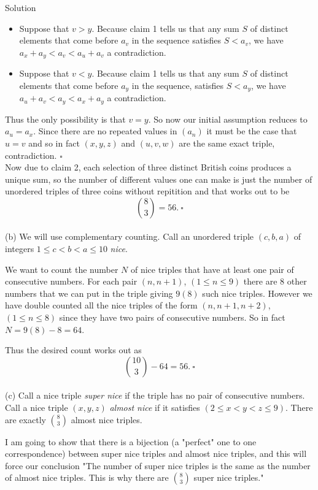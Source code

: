 \documentclass{article}
\begin{document}
\begin{solution}{Solution}
\begin{itemize}
\item Suppose that $v > y$. Because claim 1 tells us that any sum $S$ of
distinct elements that come before $a_v$ in the sequence satisfies
$S < a_v$, we have $a_x + a_y < a_v < a_u + a_v$ a contradiction.
\item Suppose that $v < y$. Because claim 1 tells us that any sum $S$ of
distinct elements that come before $a_y$ in the sequence, satisfies
$S < a_y$, we have $a_u + a_v < a_y < a_x + a_y$ a contradiction.
\end{itemize}

Thus the only possibility is that $v = y$. So now our initial assumption
reduces to $a_u = a_x$. Since there are no repeated values in $(a_n)$ it
must be the case that $u = v$ and so in fact $(x,y,z)$ and $(u,v,w)$
are the same exact triple, contradiction. $\square$
\\

Now due to claim 2, each selection of three distinct British coins
produces a unique sum, so the number of different values one can make is
just the number of unordered triples of three coins without repitition and
that works out to be
$$
\binom{8}{3} = 56. \ \square
$$
\\

(b) We will use complementary counting. Call an unordered triple $(c,b,a)$
of integers $1 \leq c < b < a \leq 10$ \textit{nice}.
\vspace{0.2cm}

We want to count
the number $N$ of nice triples that have at least one pair of consecutive
numbers. For each pair $(n, n+1)$, $(1 \leq n \leq 9)$ there are 8 other
numbers that we can put in the triple giving $9(8)$ such nice triples.
However we have double counted all the nice triples of the form
$(n, n+1, n+2)$, $(1 \leq n \leq 8)$ since they have two pairs of
consecutive numbers. So in fact $N = 9(8) - 8 = 64$.
\vspace{0.2cm}

Thus the desired count works out as
$$
\binom{10}{3} - 64 = 56. \ \square
$$
\\

(c) Call a nice triple \textit{super nice} if the triple has
no pair of consecutive numbers. Call a nice triple $(x,y,z)$
\textit{almost nice} if it satisfies $(2\leq x < y < z \leq 9)$. There
are exactly $\binom{8}{3}$ almost nice triples. \vspace{0.2cm}

I am going to show that
there is a bijection (a "perfect" one to one correspondence)
between super nice
triples and almost nice triples, and this will force our conclusion
"The number of super nice triples is the same as the number of almost nice
triples. This is why there are $\binom{8}{3}$ super nice triples."
\vspace{0.2cm}


\end{solution}
\end{document}
